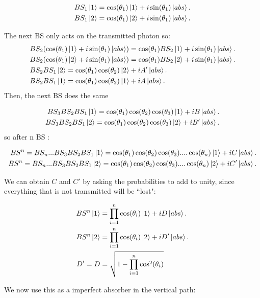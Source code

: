\documentclass[12pt]{article}
\begin{document}
\begin{align}
BS_{1}\ket{1}=\cos(\theta_{1})\ket{1}+i\sin(\theta_{1})\ket{abs}.\\
BS_{1}\ket{2}=\cos(\theta_{1})\ket{2}+i\sin(\theta_{1})\ket{abs}.
\end{align}

The next BS only acts on the transmitted photon so:
\begin{align}
&BS_{2}(\cos(\theta_{1})\ket{1}+i\sin(\theta_{1})\ket{abs})=\cos(\theta_{1})BS_{2}\ket{1}+i\sin(\theta_{1})\ket{abs}.\\
&BS_{2}(\cos(\theta_{1})\ket{2}+i\sin(\theta_{1})\ket{abs})=\cos(\theta_{1})BS_{2}\ket{2}+i\sin(\theta_{1})\ket{abs}.\\
&BS_{2}BS_{1}\ket{2}=\cos(\theta_{1})\cos(\theta_{2})\ket{2}+i A'\ket{abs}.\\
&BS_{2}BS_{1}\ket{1}=\cos(\theta_{1})\cos(\theta_{2})\ket{1}+i A\ket{abs}.
\end{align}
Then, the next BS does the same

\begin{align}
BS_{3}BS_{2}BS_{1}\ket{1}=\cos(\theta_{1})\cos(\theta_{2})\cos(\theta_{3})\ket{1}+iB\ket{abs}.\\
BS_{3}BS_{2}BS_{1}\ket{2}=\cos(\theta_{1})\cos(\theta_{2})\cos(\theta_{3})\ket{2}+iB'\ket{abs}.
\end{align}
so after n BS :

\begin{align}
BS^{n}=BS_{n}...BS_{3}BS_{2}BS_{1}\ket{1}=\cos(\theta_{1})\cos(\theta_{2})\cos(\theta_{3})....\cos(\theta_{n})\ket{1}+i C\ket{abs}.\\
BS^{n}=BS_{n}...BS_{3}BS_{2}BS_{1}\ket{2}=\cos(\theta_{1})\cos(\theta_{2})\cos(\theta_{3})....\cos(\theta_{n})\ket{2}+i C'\ket{abs}.
\end{align}

We can obtain $C$ and $C'$ by asking the probabilities to add to unity, since everything that is not transmitted will be ``lost":

\begin{align}
BS^{n}\ket{1}&=\prod_{i=1}^{n} \cos(\theta_{i})\ket{1}+i D\ket{abs}.\\
BS^{n}\ket{2}&=\prod_{i=1}^{n} \cos(\theta_{i})\ket{2}+i D'\ket{abs}.\\
D'=D&=\sqrt{1-\prod_{i=1}^{n}\cos^2(\theta_{i})}
\end{align}

We now use this as a imperfect absorber in the vertical path:
\end{document}
